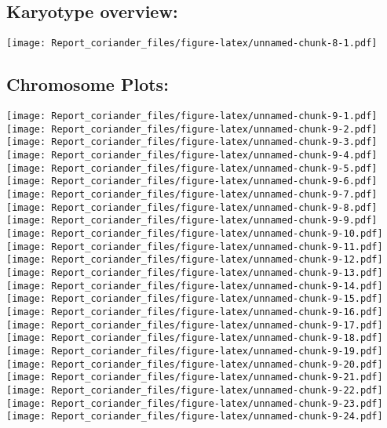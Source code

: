 \documentclass[]{article}
\begin{document}
\hypertarget{karyotype-overview}{%
\subsection{Karyotype overview:}\label{karyotype-overview}}

\texttt{[image: Report\_coriander\_files/figure-latex/unnamed-chunk-8-1.pdf]}

\hypertarget{chromosome-plots}{%
\subsection{Chromosome Plots:}\label{chromosome-plots}}

\texttt{[image: Report\_coriander\_files/figure-latex/unnamed-chunk-9-1.pdf]}
\texttt{[image: Report\_coriander\_files/figure-latex/unnamed-chunk-9-2.pdf]}
\texttt{[image: Report\_coriander\_files/figure-latex/unnamed-chunk-9-3.pdf]}
\texttt{[image: Report\_coriander\_files/figure-latex/unnamed-chunk-9-4.pdf]}
\texttt{[image: Report\_coriander\_files/figure-latex/unnamed-chunk-9-5.pdf]}
\texttt{[image: Report\_coriander\_files/figure-latex/unnamed-chunk-9-6.pdf]}
\texttt{[image: Report\_coriander\_files/figure-latex/unnamed-chunk-9-7.pdf]}
\texttt{[image: Report\_coriander\_files/figure-latex/unnamed-chunk-9-8.pdf]}
\texttt{[image: Report\_coriander\_files/figure-latex/unnamed-chunk-9-9.pdf]}
\texttt{[image: Report\_coriander\_files/figure-latex/unnamed-chunk-9-10.pdf]}
\texttt{[image: Report\_coriander\_files/figure-latex/unnamed-chunk-9-11.pdf]}
\texttt{[image: Report\_coriander\_files/figure-latex/unnamed-chunk-9-12.pdf]}
\texttt{[image: Report\_coriander\_files/figure-latex/unnamed-chunk-9-13.pdf]}
\texttt{[image: Report\_coriander\_files/figure-latex/unnamed-chunk-9-14.pdf]}
\texttt{[image: Report\_coriander\_files/figure-latex/unnamed-chunk-9-15.pdf]}
\texttt{[image: Report\_coriander\_files/figure-latex/unnamed-chunk-9-16.pdf]}
\texttt{[image: Report\_coriander\_files/figure-latex/unnamed-chunk-9-17.pdf]}
\texttt{[image: Report\_coriander\_files/figure-latex/unnamed-chunk-9-18.pdf]}
\texttt{[image: Report\_coriander\_files/figure-latex/unnamed-chunk-9-19.pdf]}
\texttt{[image: Report\_coriander\_files/figure-latex/unnamed-chunk-9-20.pdf]}
\texttt{[image: Report\_coriander\_files/figure-latex/unnamed-chunk-9-21.pdf]}
\texttt{[image: Report\_coriander\_files/figure-latex/unnamed-chunk-9-22.pdf]}
\texttt{[image: Report\_coriander\_files/figure-latex/unnamed-chunk-9-23.pdf]}
\texttt{[image: Report\_coriander\_files/figure-latex/unnamed-chunk-9-24.pdf]}
\end{document}
